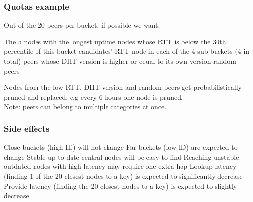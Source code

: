 \documentclass{pl-slide}
\begin{document}
\begin{frame}
\frametitle{Quotas example}
Out of the 20 peers per bucket, if possible we want:
\begin{itemize}
	\itemc The 5 nodes with the longest uptime
	 nodes whose RTT is below the 30th percentile of this bucket candidates' RTT
	 node in each of the 4 sub-buckets (4 in total)
	 peers whose DHT version is higher or equal to its own version
	 random peers
\end{itemize}
Nodes from the low RTT, DHT version and random peers get probabilistically pruned and replaced, e.g every 6 hours one node is pruned.\\
\smallskip
Note: peers can belong to multiple categories at once.
\end{frame}

\begin{frame}
\frametitle{Side effects}
\begin{itemize}
	\itemc Close buckets (high ID) will not change
	\itemc Far buckets (low ID) are expected to change
	\itemc Stable up-to-date central nodes will be easy to find
	\itemc Reaching unstable outdated nodes with high latency may require one extra hop
	\itemc Lookup latency (finding 1 of the 20 closest nodes to a key) is expected to significantly decrease
	\itemc Provide latency (finding the 20 closest nodes to a key) is expected to slightly decrease
\end{itemize}
\end{frame}
\end{document}
